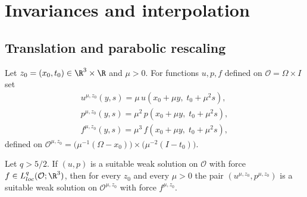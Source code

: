 \documentclass[11pt,reqno]{amsart}
\begin{document}
\section{Invariances and interpolation}\label{sec:scaling}

\subsection{Translation and parabolic rescaling}\label{ss:scaling}

\begin{definition}\label{def:rescaling}
Let $z_{0}=(x_{0},t_{0})\in\R^{3}\times\R$ and $\mu>0$. For functions
$u,p,f$ defined on $\mathcal{O}=\Omega\times I$ set
\begin{equation}\label{eq:rescaling}\begin{gathered}
  u^{\mu,z_{0}}(y,s)=\mu\,u(x_{0}+\mu y,\;t_{0}+\mu^{2}s),
  \\
  p^{\mu,z_{0}}(y,s)=\mu^{2}\,p(x_{0}+\mu y,\;t_{0}+\mu^{2}s),
  \\
  f^{\mu,z_{0}}(y,s)=\mu^{3}\,f(x_{0}+\mu y,\;t_{0}+\mu^{2}s),\end{gathered}
\end{equation}
defined on
$\mathcal{O}^{\mu,z_{0}}
 =\bigl(\mu^{-1}(\Omega-x_{0})\bigr)\times\bigl(\mu^{-2}(I-t_{0})\bigr)$.
\end{definition}

\begin{lemma}\label{lem:scaling-invariance}
Let $q>5/2$. If $(u,p)$ is a suitable weak solution on $\mathcal{O}$ with force
$f\in L^{q}_{loc}(\mathcal{O};\R^{3})$, then for every $z_{0}$ and every
$\mu>0$ the pair $(u^{\mu,z_{0}},p^{\mu,z_{0}})$ is a suitable weak solution on
$\mathcal{O}^{\mu,z_{0}}$ with force $f^{\mu,z_{0}}$.
\end{lemma}
\end{document}

